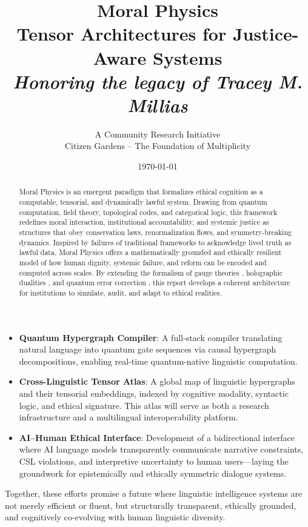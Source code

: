 \documentclass{article}
\theoremstyle{plain}
\theoremstyle{claimstyle}
\begin{document}
\begin{itemize}
    \item \textbf{Quantum Hypergraph Compiler}: A full-stack compiler translating natural language into quantum gate sequences via causal hypergraph decompositions, enabling real-time quantum-native linguistic computation.

    \item \textbf{Cross-Linguistic Tensor Atlas}: A global map of linguistic hypergraphs and their tensorial embeddings, indexed by cognitive modality, syntactic logic, and ethical signature. This atlas will serve as both a research infrastructure and a multilingual interoperability platform.

    \item \textbf{AI–Human Ethical Interface}: Development of a bidirectional interface where AI language models transparently communicate narrative constraints, CSL violations, and interpretive uncertainty to human users—laying the groundwork for epistemically and ethically symmetric dialogue systems.
\end{itemize}

Together, these efforts promise a future where linguistic intelligence systems are not merely efficient or fluent, but structurally transparent, ethically grounded, and cognitively co-evolving with human linguistic diversity.

\newpage
\title{\textbf{Moral Physics\\ \large Tensor Architectures for Justice-Aware Systems \\ \large \textit{Honoring the legacy of Tracey M. Millias}}}
\author{A Community Research Initiative \\ Citizen Gardens – The Foundation of Multiplicity}
\date{\today}


\maketitle

\begin{abstract}
Moral Physics is an emergent paradigm that formalizes ethical cognition as a computable, tensorial, and dynamically lawful system. Drawing from quantum computation, field theory, topological codes, and categorical logic, this framework redefines moral interaction, institutional accountability, and systemic justice as structures that obey conservation laws, renormalization flows, and symmetry-breaking dynamics. Inspired by failures of traditional frameworks to acknowledge lived truth as lawful data, Moral Physics offers a mathematically grounded and ethically resilient model of how human dignity, systemic failure, and reform can be encoded and computed across scales. By extending the formalism of gauge theories \citep{Noether1918}, holographic dualities \citep{Maldacena1998}, and quantum error correction \citep{Kitaev2003}, this report develops a coherent architecture for institutions to simulate, audit, and adapt to ethical realities.
\end{abstract}
\end{document}
